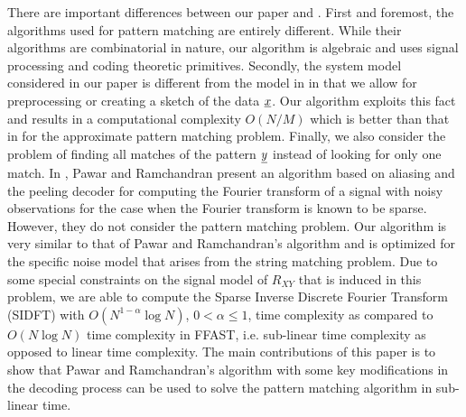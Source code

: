 There are important differences between our paper and \cite{hassanieh2012faster,andoni2013shift,boyer1977fast,amir2004faster}. First and foremost, the algorithms used for pattern matching are entirely different. While their algorithms are combinatorial in nature, our algorithm is algebraic and uses signal processing and coding theoretic primitives. Secondly, the system model considered in our paper is different from the model in \cite{hassanieh2012faster,andoni2013shift,boyer1977fast,amir2004faster} in that we allow for preprocessing or creating a sketch of the data $\underline{x}$. Our algorithm exploits this fact and results in a computational complexity $O(N/M)$ which is better than that in \cite{andoni2013shift} for the approximate pattern matching problem.  Finally, we also consider the problem of finding all matches of the pattern $\underline{y}$ instead of looking for only one match. In \cite{pawar2014robust}, Pawar and Ramchandran present an algorithm based on aliasing and the peeling decoder for computing the Fourier transform of a signal with noisy observations for the case when the Fourier transform is known to be sparse. However, they do not consider the pattern matching problem. Our algorithm is very similar to that of Pawar and Ramchandran's algorithm and is optimized for the specific noise model that arises from the string matching problem. Due to some special constraints on the signal model of $R_{XY}$ that is induced in this problem, we are able to compute the Sparse Inverse Discrete Fourier Transform (SIDFT) with $O(N^{1-\alpha} \log N)$, $0 < \alpha \leq 1$, time complexity as compared to $O(N \log N)$ time complexity in FFAST, i.e. sub-linear time complexity as opposed to linear time complexity. The main contributions of this paper is to show that Pawar and Ramchandran's algorithm with some key modifications in the decoding process can be used to solve the pattern matching algorithm in sub-linear time.
